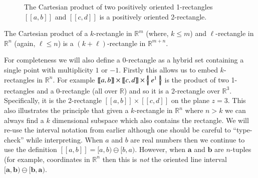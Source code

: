 \begin{figure}[h]
\caption[Cartesian product of two 1-rectangles]{The Cartesian product of two positively oriented 1-rectangles $[\![a,b]\!]$ and $[\![c,d]\!]$ is a positively oriented 2-rectangle.}
\centering
{}
\end{figure}

\begin{theorem}
	The Cartesian product of a $k$-rectangle in $\mathbb{R}^m$ (where, $k\leq m$) 
	and $\ell$-rectangle in $\mathbb{R}^n$ (again, $\ell \leq n$) 
	is a $(k+\ell)$-rectangle in $\mathbb{R}^{m+n}$.
\end{theorem}

For completeness we will also define a 0-rectangle as a hybrid set containing a single point with multiplicity $1$ or $-1$.
Firstly this allows us to embed $k$-rectangles in $\mathbb{R}^n$.
For example $[\![a,b]\!] \times [\![c,d]\!] \times \left\{ \! \left| \; e^1 \; \right| \! \right\}$ is the product of two 1-rectangles and a 0-rectangle (all over $\mathbb{R}$) and so it is a 2-rectangle over $\mathbb{R}^3$.
Specifically, it is the 2-rectangle $[\![a,b]\!] \times [\![c,d]\!]$ on the plane $z=3$.
This also illustrates the principle that given a $k$-rectangle in $\mathbb{R}^n$ where $n>k$ we can always find a $k$ dimensional subspace which also contains the rectangle.
We will re-use the interval notation from earlier although one should be careful to ``type-check'' while interpreting.
When $a$ and $b$ are real numbers then we continue to use the definition $[\![a,b]\!] = [a,b) \ominus [b,a)$.
However, when $\boldsymbol{a}$ and $\boldsymbol{b}$ are $n$-tuples (for example, coordinates in $\mathbb{R}^n$ then this is \emph{not} the oriented line interval $[\boldsymbol{a}, \boldsymbol{b}) \ominus [\boldsymbol{b}, \boldsymbol{a})$.

